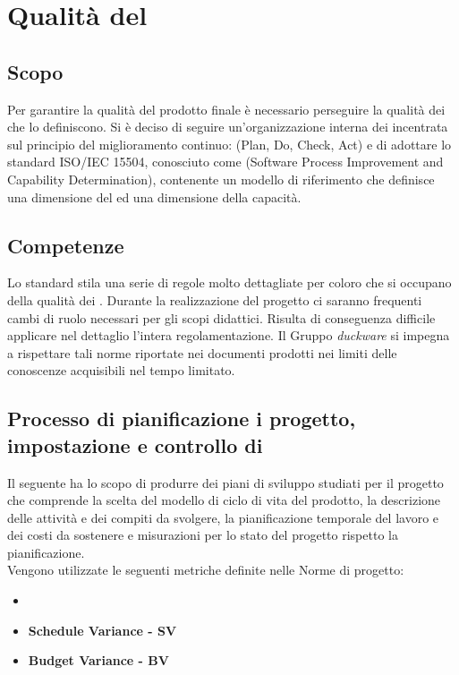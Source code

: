 \clearpage
\section{Qualità del }
\subsection{Scopo}
Per garantire la qualità del prodotto finale è necessario perseguire la qualità dei  che lo definiscono. Si è deciso di seguire un'organizzazione interna dei  incentrata sul principio del miglioramento continuo:  (Plan, Do, Check, Act) e di adottare lo standard ISO/IEC 15504, conosciuto come  (Software Process Improvement and Capability Determination), contenente un modello di riferimento che definisce una dimensione del  ed una dimensione della capacità.
\subsection{Competenze}
Lo standard stila una serie di regole molto dettagliate per coloro che si occupano della qualità dei . Durante la realizzazione del progetto ci saranno frequenti cambi di ruolo necessari per gli scopi didattici. Risulta di conseguenza difficile applicare nel dettaglio l'intera regolamentazione. Il Gruppo \emph{duckware} si impegna a rispettare tali norme riportate nei documenti prodotti nei limiti delle conoscenze acquisibili nel tempo limitato.
\subsection{Processo di pianificazione i progetto, impostazione e controllo di }
Il seguente  ha lo scopo di produrre dei piani di sviluppo studiati per il progetto che comprende la scelta del modello di ciclo di vita del prodotto, la descrizione delle attività e dei compiti da svolgere, la pianificazione temporale del lavoro e dei costi da sostenere e misurazioni per lo stato del progetto rispetto la pianificazione.\\
Vengono utilizzate le seguenti metriche definite nelle Norme di progetto:
\begin{itemize}
	\item \textbf{}
	\item \textbf{Schedule Variance - SV}
	\item \textbf{Budget Variance - BV}
\end{itemize}
\clearpage

